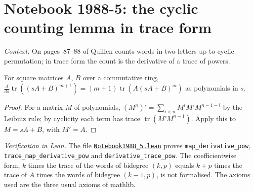 \section[Notebook 1988-5: the cyclic counting lemma]{Notebook 1988-5: the cyclic counting lemma in trace form\protect{}}\label{sec:quillen-1988-5}

\emph{Context.} On pages~87--88 of  Quillen counts words in two letters up to cyclic permutation; in trace form the count is the derivative of a trace of powers.

\begin{encadre}
\begin{theoreme}\label{thm:quillen-1988-5}
For square matrices $A$, $B$ over a commutative ring, $\frac{d}{ds}\operatorname{tr}((sA + B)^{m+1}) = (m + 1)\operatorname{tr}(A(sA + B)^m)$ as polynomials in $s$.
\end{theoreme}
\end{encadre}

\begin{proof}
For a matrix $M$ of polynomials, $(M^n)' = \sum_{i<n}M^iM'M^{n-1-i}$ by the Leibniz rule; by cyclicity each term has trace $\operatorname{tr}(M'M^{n-1})$. Apply this to $M = sA + B$, with $M' = A$.
\end{proof}

\emph{Verification in Lean.} The file \href{\leanblobmain/Notebook1988_5.lean}{\texttt{Notebook1988\_5.\allowbreak{}lean}} proves \texttt{map\_derivative\_pow}, \texttt{trace\_map\_derivative\_pow} and \texttt{derivative\_trace\_pow}. The coefficientwise form, $k$ times the trace of the words of bidegree $(k, p)$ equals $k + p$ times the trace of $A$ times the words of bidegree $(k - 1, p)$, is not formalised. The axioms used are the three usual axioms of mathlib.

